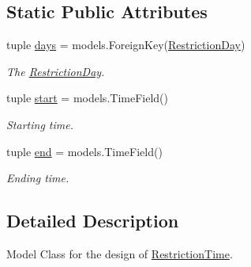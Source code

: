 \subsection*{Static Public Attributes}
\begin{DoxyCompactItemize}
\item 
\hypertarget{classrestriction__system_1_1models_1_1RestrictionTime_a87e70ee6822b9dbf7c09fe008920cf23}{}tuple \hyperlink{classrestriction__system_1_1models_1_1RestrictionTime_a87e70ee6822b9dbf7c09fe008920cf23}{days} = models.\+Foreign\+Key(\hyperlink{classrestriction__system_1_1models_1_1RestrictionDay}{Restriction\+Day})\label{classrestriction__system_1_1models_1_1RestrictionTime_a87e70ee6822b9dbf7c09fe008920cf23}

\begin{DoxyCompactList}\small\item\em The \hyperlink{classrestriction__system_1_1models_1_1RestrictionDay}{Restriction\+Day}. \end{DoxyCompactList}\item 
\hypertarget{classrestriction__system_1_1models_1_1RestrictionTime_ad1b647da2b1e8dd68e2c34278ac007ef}{}tuple \hyperlink{classrestriction__system_1_1models_1_1RestrictionTime_ad1b647da2b1e8dd68e2c34278ac007ef}{start} = models.\+Time\+Field()\label{classrestriction__system_1_1models_1_1RestrictionTime_ad1b647da2b1e8dd68e2c34278ac007ef}

\begin{DoxyCompactList}\small\item\em Starting time. \end{DoxyCompactList}\item 
\hypertarget{classrestriction__system_1_1models_1_1RestrictionTime_a13103873169fc844afc60433df188696}{}tuple \hyperlink{classrestriction__system_1_1models_1_1RestrictionTime_a13103873169fc844afc60433df188696}{end} = models.\+Time\+Field()\label{classrestriction__system_1_1models_1_1RestrictionTime_a13103873169fc844afc60433df188696}

\begin{DoxyCompactList}\small\item\em Ending time. \end{DoxyCompactList}\end{DoxyCompactItemize}


\subsection{Detailed Description}
Model Class for the design of \hyperlink{classrestriction__system_1_1models_1_1RestrictionTime}{Restriction\+Time}. 

